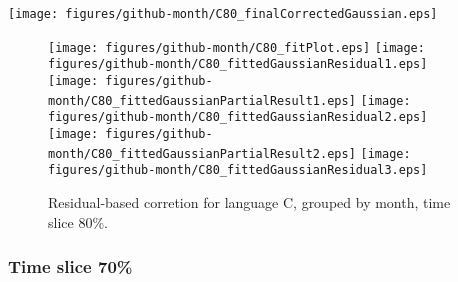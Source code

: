 \begin{center}
{\texttt{[image: figures/github-month/C80\_finalCorrectedGaussian.eps]}}
\end{center}

\FloatBarrier

\begin{figure}[t]
\centering
{}
{\texttt{[image: figures/github-month/C80\_fitPlot.eps]}}
{\texttt{[image: figures/github-month/C80\_fittedGaussianResidual1.eps]}}
{\texttt{[image: figures/github-month/C80\_fittedGaussianPartialResult1.eps]}}
{\texttt{[image: figures/github-month/C80\_fittedGaussianResidual2.eps]}}
{\texttt{[image: figures/github-month/C80\_fittedGaussianPartialResult2.eps]}}
{\texttt{[image: figures/github-month/C80\_fittedGaussianResidual3.eps]}}
\caption{Residual-based corretion for language C, grouped by month, time slice 80\%.}
\end{figure}


\FloatBarrier


\subsubsection{Time slice 70\%}

